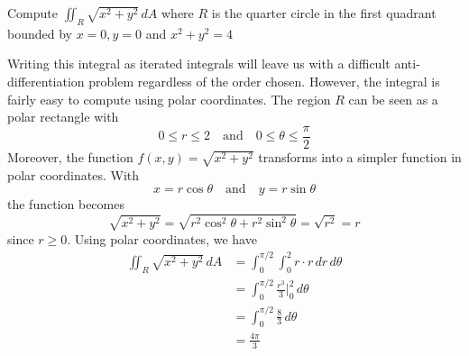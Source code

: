 \documentclass[handout]{ximera}
\begin{document}
\begin{example}[Example 1]
Compute $\iint_R \sqrt{x^2 + y^2} \, dA$ where $R$ is the quarter circle in the first quadrant bounded by $x=0, y=0$ and $x^2 + y^2 = 4$

\begin{image}
\end{image}
Writing this integral as iterated integrals will leave us with a difficult anti-differentiation problem regardless of the order chosen.
However, the integral is fairly easy to compute using polar coordinates. The region $R$ can be seen as a polar rectangle with 
\[
0\leq r \leq 2 \quad \text{and} \quad 0 \leq \theta \leq \frac{\pi}{2}
\]
Moreover, the function $f(x,y) = \sqrt{x^2 + y^2}$ transforms into a simpler function in polar coordinates. With
\[
x = r\cos \theta \quad \text{and} \quad y = r\sin \theta
\]
the function becomes
\[
\sqrt{x^2 +y^2} = \sqrt{r^2 \cos^2 \theta + r^2 \sin^2 \theta} = \sqrt{r^2} = r
\]
since $r \geq 0$.
Using polar coordinates, we have
\begin{align*}
\iint_R \sqrt{x^2 + y^2} \, dA & = \int_0^{\pi/2} \int_0^2 r \cdot r \, dr \, d\theta\\
                 & = \int_0^{\pi/2}  \frac{r^3}{3} \bigg|_{0}^2 \, d\theta\\
                 & = \int_0^{\pi/2} \frac83\, d\theta\\
                 &= \frac{4\pi}{3}
\end{align*}  

\end{example}
\end{document}
